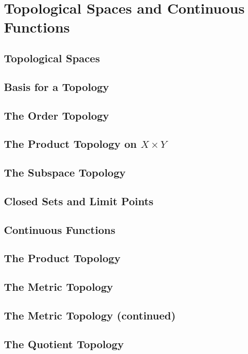 \chapter{Topological Spaces and Continuous Functions}

\section{Topological Spaces}

\section{Basis for a Topology}

\section{The Order Topology}

\section{The Product Topology on $X\times Y$}

\section{The Subspace Topology}

\section{Closed Sets and Limit Points}

\section{Continuous Functions}

\section{The Product Topology}

\section{The Metric Topology}

\section{The Metric Topology (continued)}

\section{The Quotient Topology}

